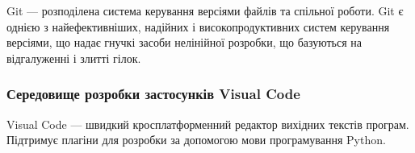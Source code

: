 Git --- розподілена система керування версіями файлів та спільної роботи. Git є однією з найефективніших, надійних і високопродуктивних систем керування версіями, що надає гнучкі засоби нелінійної розробки, що базуються на відгалуженні і злитті гілок.

\subsubsection{Середовище розробки застосунків Visual Code}
Visual Code --- швидкий кросплатформенний редактор вихідних текстів програм. Підтримує плагіни для розробки за допомогою мови програмування Python.
